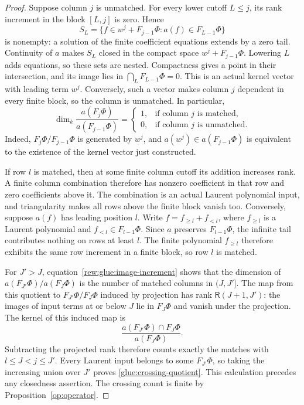 \begin{proof}
Suppose column $j$ is unmatched. For every lower cutoff $L\le j$,
its rank increment in the block $[L,j]$ is zero. Hence
\[
 S_L=\{f\in w^j+F_{j-1}\Phi:a(f)\in F_{L-1}\Phi\}
\]
is nonempty: a solution of the finite coefficient equations extends
by a zero tail. Continuity of $a$ makes $S_L$ closed in the compact
space $w^j+F_{j-1}\Phi$. Lowering $L$ adds equations, so these
sets are nested. Compactness gives a point in their intersection,
and its image lies in $\bigcap_LF_{L-1}\Phi=0$. This is an actual
kernel vector with leading term $w^j$. Conversely, such a vector
makes column $j$ dependent in every finite block, so the column is
unmatched. In particular,
\begin{equation}
 \dim_k\frac{a(F_j\Phi)}{a(F_{j-1}\Phi)}
 =
 \begin{cases}
 1,&\text{if column $j$ is matched},\\
 0,&\text{if column $j$ is unmatched}.
 \end{cases}
 \label{rew:glue:image-increment}
\end{equation}
Indeed, $F_j\Phi/F_{j-1}\Phi$ is generated by $w^j$, and
$a(w^j)\in a(F_{j-1}\Phi)$ is equivalent to the existence of the
kernel vector just constructed.

If row $l$ is matched, then at some finite column cutoff its
addition increases rank. A finite column combination therefore
has nonzero coefficient in that row and zero coefficients above
it. The combination is an actual Laurent polynomial input, and
triangularity makes all rows above the finite block vanish too.
Conversely, suppose $a(f)$ has leading position $l$. Write
$f=f_{\ge l}+f_{<l}$, where $f_{\ge l}$ is a Laurent polynomial
and $f_{<l}\in F_{l-1}\Phi$. Since $a$ preserves $F_{l-1}\Phi$,
the infinite tail contributes nothing on rows at least $l$.
The finite polynomial $f_{\ge l}$ therefore exhibits the same
row increment in a finite block, so row $l$ is matched.

For $J'>J$, equation~\eqref{rew:glue:image-increment} shows that
the dimension of $a(F_{J'}\Phi)/a(F_J\Phi)$ is the number of
matched columns in $(J,J']$. The map from this quotient to
$F_{J'}\Phi/F_J\Phi$ induced by projection has rank
$\mathsf R(J+1,J')$: the images of input terms at or below $J$
lie in $F_J\Phi$ and vanish under the projection. The kernel of
this induced map is
\[
 \frac{a(F_{J'}\Phi)\cap F_J\Phi}{a(F_J\Phi)}.
\]
Subtracting the projected rank therefore counts exactly the matches
with $l\le J<j\le J'$. Every Laurent input belongs to some
$F_{J'}\Phi$, so taking the increasing union over $J'$ proves
\eqref{glue:crossing-quotient}. This calculation precedes any
closedness assertion. The crossing count is finite by
Proposition~\ref{op:operator}.


\end{proof}
